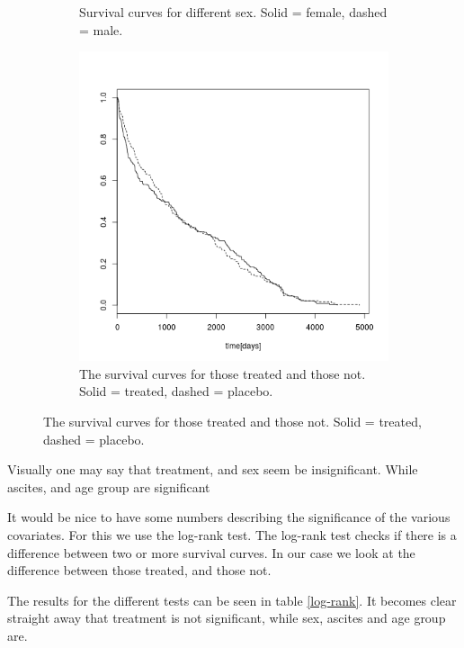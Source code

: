 \documentclass[a4paper]{article}
\begin{document}
\begin{figure}
\begin{subfigure}{.5\textwidth}
  \caption{Survival curves for different sex. Solid = female, dashed = male.}
  \label{sex}
 \end{subfigure}
 \begin{subfigure}{.5\textwidth}
  \includegraphics[width=\textwidth]{treat.png}
  \caption{The survival curves for those treated and those not. Solid = treated, dashed = placebo.}
  \label{treat}
 \end{subfigure}
\end{figure}  


Visually one may say that treatment, and sex seem be insignificant. While ascites, and age group are significant

It would be nice to have some numbers describing the significance of the various covariates. 
For this we use the log-rank test. The log-rank test checks if there is a difference between two or more survival curves. In our case we look at the difference between those treated, and those not. 

The results for the different tests can be seen in table \ref{log-rank}. It becomes clear straight away that treatment is not significant, while sex, ascites and age group are. 
\end{document}
